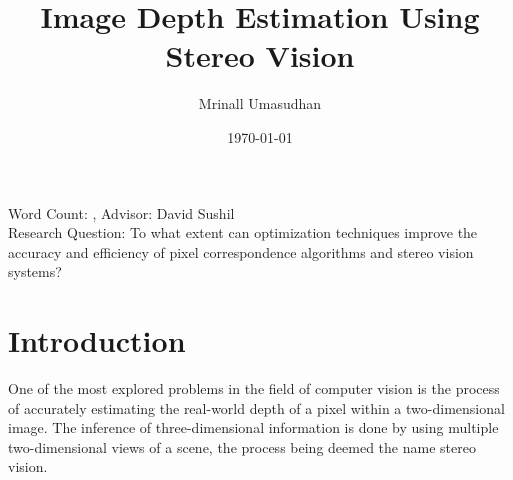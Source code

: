 \documentclass[11pt]{scrartcl}
\begin{document}
\title{Image Depth Estimation Using Stereo Vision}
\author{Mrinall Umasudhan}
\date{\today}
\maketitle
{}

  \noindent Word Count: ,
  Advisor: David Sushil \\ 
  Research Question: To what extent can optimization techniques improve the accuracy and 
  efficiency of pixel correspondence algorithms and stereo vision systems?
 
\tableofcontents




\section{Introduction}
One of the most explored problems in the field of computer vision is the process
of accurately estimating the real-world depth of a pixel within a two-dimensional
image. The inference of three-dimensional information is done by using multiple two-dimensional views of a scene, the process being deemed the name stereo vision.
\end{document}
